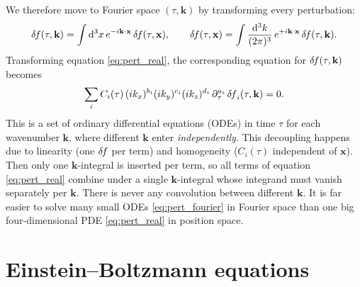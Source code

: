 \documentclass[USenglish, thumbmarks]{uiophdthesis} %
\newcommand\diff{\mathrm{d}}
\newcommand\EB{Einstein--Boltzmann}
\newcommand\deltaf{{\delta\mkern-2mu f}} %
\begin{document}
We therefore move to Fourier space $(\tau, \mathbf{k})$ by transforming every perturbation:%
\begin{equation}
\deltaf(\tau, \mathbf{k}) = \int \diff{^3 x} \, e^{-i \mathbf{k} \cdot \mathbf{x}} \, \deltaf(\tau, \mathbf{x}), \qquad %
\deltaf(\tau, \mathbf{x}) = \int \frac{\diff{^3 k}}{(2\pi)^3} \, e^{+i \mathbf{k} \cdot \mathbf{x}} \, \deltaf(\tau, \mathbf{k}). %
\end{equation}
Transforming equation \eqref{eq:pert_real},
the corresponding equation for $\deltaf(\tau, \mathbf{k})$ becomes
\begin{equation}
\sum_i C_i(\tau) \, (i k_x)^{b_i} (i k_y)^{c_i} (i k_z)^{d_i} \, \partial_\tau^{a_i} \, \deltaf_i(\tau, \mathbf{k}) = 0.
\label{eq:pert_fourier}
\end{equation}
This is a set of ordinary differential equations (ODEs) in time $\tau$ for each wavenumber $\mathbf{k}$,
where different $\mathbf{k}$ enter \emph{independently}.
This decoupling happens due to linearity (one $\deltaf$ per term)
and homogeneity ($C_i(\tau)$ independent of $\mathbf{x}$).
Then only one $\mathbf{k}$-integral is inserted per term,
so all terms of equation \eqref{eq:pert_real} combine under a single $\mathbf{k}$-integral
whose integrand must vanish separately per $\mathbf{k}$.
There is never any convolution between different $\mathbf{k}$.
It is far easier to solve many small ODEs \eqref{eq:pert_fourier} in Fourier space
than one big four-dimensional PDE \eqref{eq:pert_real} in position space.

\section{\EB{} equations}
\label{sec:eb_fundamentals}
\end{document}
